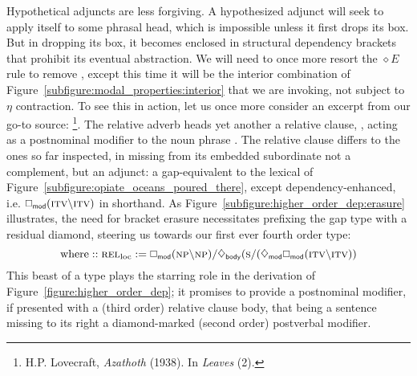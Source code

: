 Hypothetical adjuncts are less forgiving.
A hypothesized adjunct will seek to apply itself to some phrasal head, which is impossible unless it first drops its box.
But in dropping its box, it becomes enclosed in structural dependency brackets that prohibit its eventual abstraction.
We will need to once more resort the $\diamond E$ rule to remove , except this time it will be the interior combination of Figure~\ref{subfigure:modal_properties:interior} that we are invoking, not subject to $\eta$ contraction.
To see this in action, let us once more consider an excerpt from our go-to source: %
\footnote{H.P. Lovecraft, \textit{Azathoth} (1938). In \textit{Leaves} (2).}.
The relative adverb  heads yet another a relative clause, , acting as a postnominal modifier to the noun phrase .
The relative clause differs to the ones so far inspected, in missing from its embedded subordinate  not a complement, but an adjunct: a gap-equivalent to the lexical  of Figure~\ref{subfigure:opiate_oceans_poured_there}, except dependency-enhanced, i.e. $\dbox{mod}(\smallgtype{itv}\divleft\smallgtype{itv})$ in shorthand.
As Figure~\ref{subfigure:higher_order_dep:erasure} illustrates, the need for bracket erasure necessitates prefixing the gap type with a residual diamond, steering us towards our first ever fourth order type:
\begin{equation}
\text{where} :: \subcat{l}{rel}{loc} := \dbox{mod}(\np\divleft\np)\divright\ddia{body}(\s\divright(\ddia{mod}\dbox{mod}(\smallgtype{itv}\divleft\smallgtype{itv}))
\end{equation} 
This beast of a type plays the starring role in the derivation of Figure~\ref{figure:higher_order_dep}; it promises to provide a postnominal modifier, if presented with a (third order) relative clause body, that being a sentence missing to its right a diamond-marked (second order) postverbal modifier.

